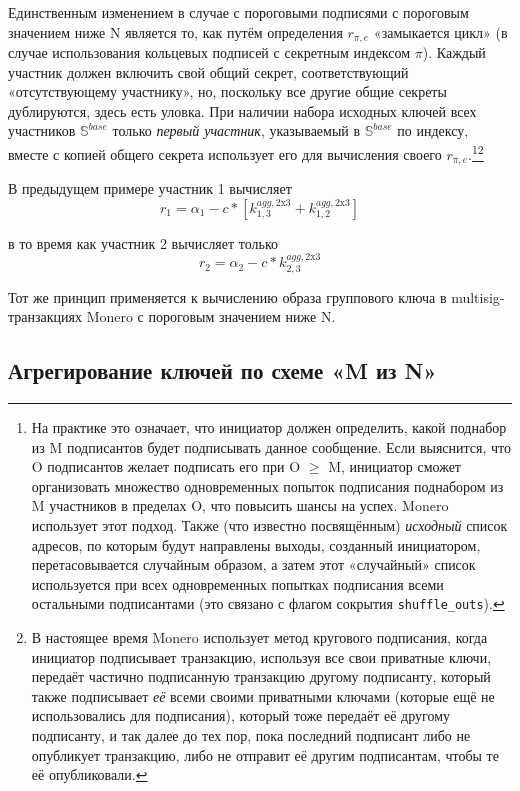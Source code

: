 Единственным изменением в случае с пороговыми подписями с пороговым значением ниже N является то, как путём определения $r_{\pi,e}$ «замыкается цикл» (в случае использования кольцевых подписей с секретным индексом $\pi$). Каждый участник должен включить свой общий секрет, соответствующий «отсутствующему участнику», но, поскольку все другие общие секреты дублируются, здесь есть уловка. При наличии набора исходных ключей всех участников $\mathbb{S}^{base}$ только {\em первый участник}, указываемый в $\mathbb{S}^{base}$ по индексу, вместе с копией общего секрета использует его для вычисления своего $r_{\pi,e}$.\footnote{На практике это означает, что инициатор должен определить, какой поднабор из M подписантов будет подписывать данное сообщение. Если выяснится, что O подписантов желает подписать его при O $\geq$ M, инициатор сможет организовать множество одновременных попыток подписания поднабором из M участников в пределах O, что повысить шансы на успех. Monero использует этот подход. Также (что известно посвящённым) {\em исходный} список адресов, по которым будут направлены выходы, созданный инициатором, перетасовывается случайным образом, а затем этот «случайный» список используется при всех одновременных попытках подписания всеми остальными подписантами (это связано с флагом сокрытия {\tt shuffle\_outs}).}\footnote{В настоящее время Monero использует метод кругового подписания, когда инициатор подписывает транзакцию, используя все свои приватные ключи, передаёт частично подписанную транзакцию другому подписанту, который также подписывает {\em её} всеми своими приватными ключами (которые ещё не использовались для подписания), который тоже передаёт её другому подписанту, и так далее до тех пор, пока последний подписант либо не опубликует транзакцию, либо не отправит её другим подписантам, чтобы те её опубликовали.}

В предыдущем примере участник 1 вычисляет\vspace{.175cm}
\[r_1 = \alpha_1 - c*[k^{agg,\textrm{2x3}}_{1,3} + k^{agg,\textrm{2x3}}_{1,2}]\] 

в то время как участник 2 вычисляет только
\[r_2 = \alpha_2 - c*k^{agg,\textrm{2x3}}_{2,3}\]

Тот же принцип применяется к вычислению образа группового ключа в multisig-транзакциях Monero с пороговым значением ниже N.


\subsection{Агрегирование ключей по схеме «M из N»}
\label{sec:m-of-n}

